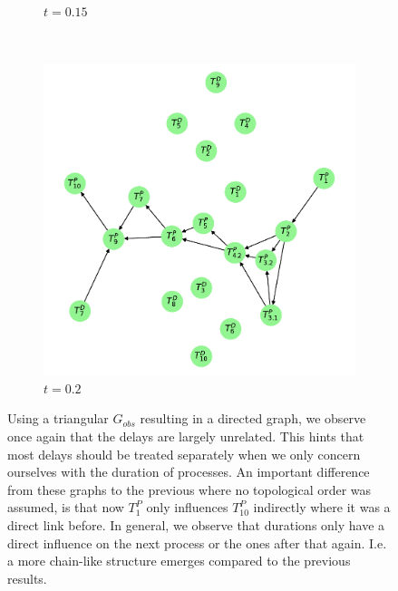 \documentclass[../Thesis.tex]{subfiles}
\begin{document}
\begin{figure}[H]
\begin{subfigure}[t]{0.43\linewidth}
        \caption{$t = 0.15$}
        \label{subfig:G_dir times directed - graph - t 0.15}
    \end{subfigure}
    \\[\baselineskip]
    \begin{subfigure}[t]{0.43\linewidth}
        \includegraphics[width = \linewidth]{figures/Cycle data/G_dir times as graph - directed - 0_2.pdf}
        \caption{$t=0.2$}
        \label{subfig:G_dir times directed - graph - t 0.2}
    \end{subfigure}
    \caption{Using a triangular $G_{obs}$ resulting in a directed graph, we observe once again that the delays are largely unrelated. This hints that most delays should be treated separately when we only concern ourselves with the duration of processes. An important difference from these graphs to the previous where no topological order was assumed, is that now $T^P_1$ only influences $T^P_{10}$ indirectly where it was a direct link before. In general, we observe that durations only have a direct influence on the next process or the ones after that again. I.e. a more chain-like structure emerges compared to the previous results.}
    \label{fig:G_dir times directed - graphs}
\end{figure}
\end{document}

